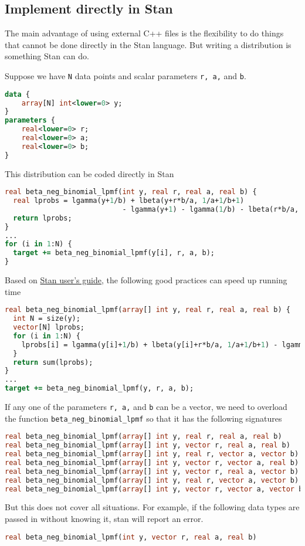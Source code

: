 \documentclass[11pt]{article}
\begin{document}
\subsection{Implement directly in Stan}

The main advantage of using external C++ files is the flexibility to do things that cannot be done directly in the Stan language. But writing a distribution is something Stan can do.

Suppose we have \verb|N| data points and scalar parameters \verb|r, a,| and \verb|b|.
\begin{lstlisting}[language=Stan, style=lgeneral]
data {
	array[N] int<lower=0> y;
}
parameters {
	real<lower=0> r;
	real<lower=0> a;
	real<lower=0> b;
}
\end{lstlisting}


This distribution can be coded directly in Stan
\begin{lstlisting}[language=Stan, style=lgeneral]
real beta_neg_binomial_lpmf(int y, real r, real a, real b) {
  real lprobs = lgamma(y+1/b) + lbeta(y+r*b/a, 1/a+1/b+1) 
  							- lgamma(y+1) - lgamma(1/b) - lbeta(r*b/a, 1/a+1);
  return lprobs;
}
...
for (i in 1:N) {
  target += beta_neg_binomial_lpmf(y[i], r, a, b);
}
\end{lstlisting}
Based on \href{https://mc-stan.org/docs/stan-users-guide/vectorization.html}{Stan user's guide}, the following good practices can speed up running time
\begin{lstlisting}[language=Stan, style=lgeneral]
real beta_neg_binomial_lpmf(array[] int y, real r, real a, real b) {
  int N = size(y);
  vector[N] lprobs;
  for (i in 1:N) {
    lprobs[i] = lgamma(y[i]+1/b) + lbeta(y[i]+r*b/a, 1/a+1/b+1) - lgamma(y[i]+1) - lgamma(1/b) - lbeta(r*b/a, 1/a+1);
  }
  return sum(lprobs);
}
...
target += beta_neg_binomial_lpmf(y, r, a, b);
\end{lstlisting}

If any one of the parameters \verb|r, a,| and \verb|b| can be a vector, we need to overload the function \verb|beta_neg_binomial_lpmf| so that it has the following signatures
\begin{lstlisting}[language=Stan, style=lgeneral]
real beta_neg_binomial_lpmf(array[] int y, real r, real a, real b)
real beta_neg_binomial_lpmf(array[] int y, vector r, real a, real b)
real beta_neg_binomial_lpmf(array[] int y, real r, vector a, vector b)
real beta_neg_binomial_lpmf(array[] int y, vector r, vector a, real b)
real beta_neg_binomial_lpmf(array[] int y, vector r, real a, vector b)
real beta_neg_binomial_lpmf(array[] int y, real r, vector a, vector b)
real beta_neg_binomial_lpmf(array[] int y, vector r, vector a, vector b)
\end{lstlisting}
But this does not cover all situations. For example, if the following data types are passed in without knowing it, stan will report an error.
\begin{lstlisting}[language=Stan, style=lgeneral]
real beta_neg_binomial_lpmf(int y, vector r, real a, real b)
\end{lstlisting}
\end{document}
